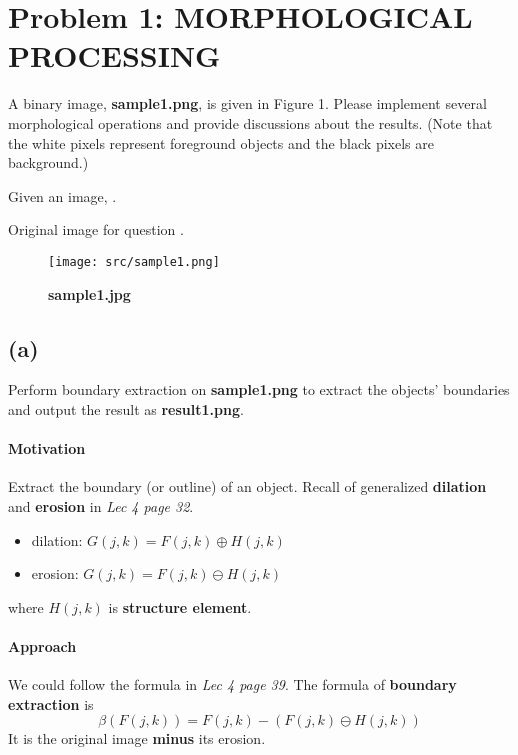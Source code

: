\section{Problem 1: MORPHOLOGICAL PROCESSING}\label{problem-1-morph-process}
A binary image, \textbf{sample1.png}, is given in Figure 1. Please implement several morphological operations and provide discussions about the results. (Note that the white pixels represent foreground objects and the black pixels are background.)

Given an image, .

Original image  for question .
\begin{figure}
    \centering
    \texttt{[image: src/sample1.png]}
    \caption{\textbf{sample1.jpg}}
    \label{sample1}
\end{figure}

\subsection{(a)}\label{1_a}
Perform boundary extraction on \textbf{sample1.png} to extract the objects’ boundaries and output the result as \textbf{result1.png}.

\paragraph{Motivation}
Extract the boundary (or outline) of an object.
Recall of generalized \textbf{dilation} and \textbf{erosion} in \textit{Lec 4 page 32}.
\begin{itemize}
    \item dilation: \(G(j, k) = F(j, k) \oplus H(j, k) \)
    \item erosion: \(G(j, k) = F(j, k) \ominus H(j, k) \)
\end{itemize}
where \(H(j, k)\) is \textbf{structure element}.

\paragraph{Approach}
We could follow the formula in \textit{Lec 4 page 39}. The formula of \textbf{boundary extraction} is 
\[
    \beta(F(j, k)) = F(j, k) - (F(j, k) \ominus H(j, k))
\]
It is the original image \textbf{minus} its erosion.


